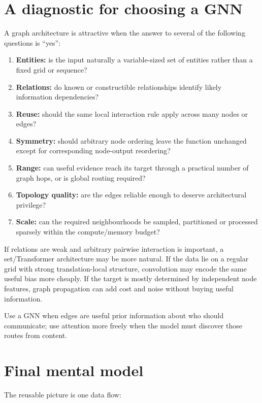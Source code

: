 \section{A diagnostic for choosing a GNN}
A graph architecture is attractive when the answer to several of the following questions is ``yes'':
\begin{enumerate}
  \item \textbf{Entities:} is the input naturally a variable-sized set of entities rather than a fixed grid or sequence?
  \item \textbf{Relations:} do known or constructible relationships identify likely information dependencies?
  \item \textbf{Reuse:} should the same local interaction rule apply across many nodes or edges?
  \item \textbf{Symmetry:} should arbitrary node ordering leave the function unchanged except for corresponding node-output reordering?
  \item \textbf{Range:} can useful evidence reach its target through a practical number of graph hops, or is global routing required?
  \item \textbf{Topology quality:} are the edges reliable enough to deserve architectural privilege?
  \item \textbf{Scale:} can the required neighbourhoods be sampled, partitioned or processed sparsely within the compute/memory budget?
\end{enumerate}

If relations are weak and arbitrary pairwise interaction is important, a set/Transformer architecture may be more natural.
If the data lie on a regular grid with strong translation-local structure, convolution may encode the same useful bias more cheaply.
If the target is mostly determined by independent node features, graph propagation can add cost and noise without buying useful information.

\begin{calloutintuition}
Use a GNN when edges are useful prior information about who should communicate; use attention more freely when the model must discover those routes from content.
\end{calloutintuition}

\section{Final mental model}
The reusable picture is one data flow:

